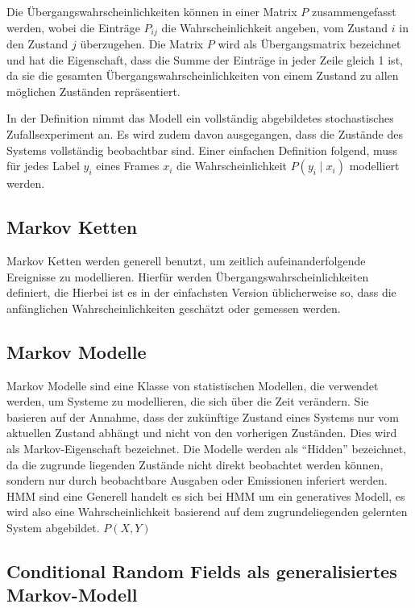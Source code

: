 Die Übergangswahrscheinlichkeiten können in einer Matrix $P$ zusammengefasst werden, wobei die Einträge $P_{ij}$ die Wahrscheinlichkeit angeben, vom Zustand $i$ in den Zustand $j$ überzugehen. Die Matrix $P$ wird als Übergangsmatrix bezeichnet und hat die Eigenschaft, dass die Summe der Einträge in jeder Zeile gleich 1 ist, da sie die gesamten Übergangswahrscheinlichkeiten von einem Zustand zu allen möglichen Zuständen repräsentiert.

In der Definition nimmt das Modell ein vollständig abgebildetes stochastisches Zufallsexperiment an. Es wird zudem davon ausgegangen, dass die Zustände des Systems vollständig beobachtbar sind. Einer einfachen Definition folgend, muss für jedes Label $y_i$ eines Frames $x_i$ die Wahrscheinlichkeit $P(y_i \mid x_i)$ modelliert werden.

\subsection{Markov Ketten}

Markov Ketten werden generell benutzt, um zeitlich aufeinanderfolgende Ereignisse zu modellieren. Hierfür werden Übergangswahrscheinlichkeiten definiert, die  Hierbei ist es in der einfachsten Version üblicherweise so, dass die anfänglichen Wahrscheinlichkeiten geschätzt oder gemessen werden.

\subsection{Markov Modelle}

Markov Modelle sind eine Klasse von statistischen Modellen, die verwendet werden, um Systeme zu modellieren, die sich über die Zeit verändern. Sie basieren auf der Annahme, dass der zukünftige Zustand eines Systems nur vom aktuellen Zustand abhängt und nicht von den vorherigen Zuständen. Dies wird als Markov-Eigenschaft bezeichnet.
Die Modelle werden als \enquote{Hidden} bezeichnet, da die zugrunde liegenden Zustände nicht direkt beobachtet werden können, sondern nur durch beobachtbare Ausgaben oder Emissionen inferiert werden.
\newline
HMM sind eine 
Generell handelt es sich bei HMM um ein generatives Modell, es wird also eine Wahrscheinlichkeit basierend auf dem zugrundeliegenden gelernten System abgebildet.
$P(X, Y)$


\subsection{Conditional Random Fields als generalisiertes Markov-Modell}

